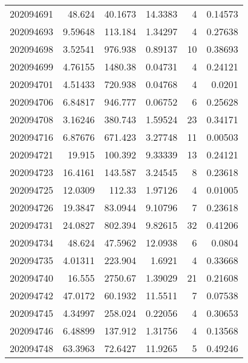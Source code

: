 \begin{tabular}{rrrrrr}
 202094691 &         48.624   &       40.1673 &           14.3383  &           4 & 0.14573 \\
 202094693 &          9.59648 &      113.184  &            1.34297 &           4 & 0.27638 \\
 202094698 &          3.52541 &      976.938  &            0.89137 &          10 & 0.38693 \\
 202094699 &          4.76155 &     1480.38   &            0.04731 &           4 & 0.24121 \\
 202094701 &          4.51433 &      720.938  &            0.04768 &           4 & 0.0201  \\
 202094706 &          6.84817 &      946.777  &            0.06752 &           6 & 0.25628 \\
 202094708 &          3.16246 &      380.743  &            1.59524 &          23 & 0.34171 \\
 202094716 &          6.87676 &      671.423  &            3.27748 &          11 & 0.00503 \\
 202094721 &         19.915   &      100.392  &            9.33339 &          13 & 0.24121 \\
 202094723 &         16.4161  &      143.587  &            3.24545 &           8 & 0.23618 \\
 202094725 &         12.0309  &      112.33   &            1.97126 &           4 & 0.01005 \\
 202094726 &         19.3847  &       83.0944 &            9.10796 &           7 & 0.23618 \\
 202094731 &         24.0827  &      802.394  &            9.82615 &          32 & 0.41206 \\
 202094734 &         48.624   &       47.5962 &           12.0938  &           6 & 0.0804  \\
 202094735 &          4.01311 &      223.904  &            1.6921  &           4 & 0.33668 \\
 202094740 &         16.555   &     2750.67   &            1.39029 &          21 & 0.21608 \\
 202094742 &         47.0172  &       60.1932 &           11.5511  &           7 & 0.07538 \\
 202094745 &          4.34997 &      258.024  &            0.22056 &           4 & 0.30653 \\
 202094746 &          6.48899 &      137.912  &            1.31756 &           4 & 0.13568 \\
 202094748 &         63.3963  &       72.6427 &           11.9265  &           5 & 0.49246 \\

\end{tabular}
